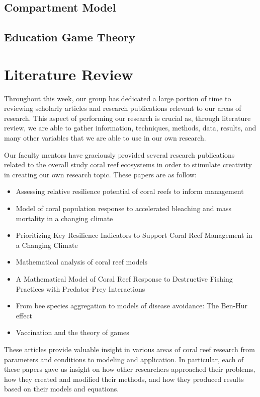 \documentclass[12pt]{article}
\begin{document}
\subsection{Compartment Model}
\subsection{Education Game Theory}

\section{Literature Review}
Throughout this week, our group has dedicated a large portion of time to reviewing scholarly articles and research publications relevant to our areas of research. This aspect of performing our research is crucial as, through literature review, we are able to gather information, techniques, methods, data, results, and many other variables that we are able to use in our own research. \par
Our faculty mentors have graciously provided several research publications related to the overall study coral reef ecosystems in order to stimulate creativity in creating our own research topic. These papers are as follow:
\begin{itemize}
    \item Assessing relative resilience potential of coral reefs to inform management\cite{assesing_relative}
    \item Model of coral population response to accelerated bleaching and mass mortality in a changing climate\cite{Riegl_Purkis_Model}
    \item Prioritizing Key Resilience Indicators to Support Coral Reef Management in a Changing Climate\cite{prioritize}
    \item Mathematical analysis of coral reef models\cite{mathanalysis}
    \item A Mathematical Model of Coral Reef Response to Destructive Fishing Practices with Predator-Prey Interactions\cite{quintero_machuca_cotto_bradley_ríos-soto_2016}
    \item From bee species aggregation to models of disease avoidance: The Ben-Hur effect\cite{yong_herrera_castillo-chavez_2016}
    \item Vaccination and the theory of games\cite{bauch_earn_2004}
\end{itemize}
These articles provide valuable insight in various areas of coral reef research from parameters and conditions to modeling and application. In particular, each of these papers gave us insight on how other researchers approached their problems, how they created and modified their methods, and how they produced results based on their models and equations. 


\newpage
% 
% 
\printbibliography
\end{document}
